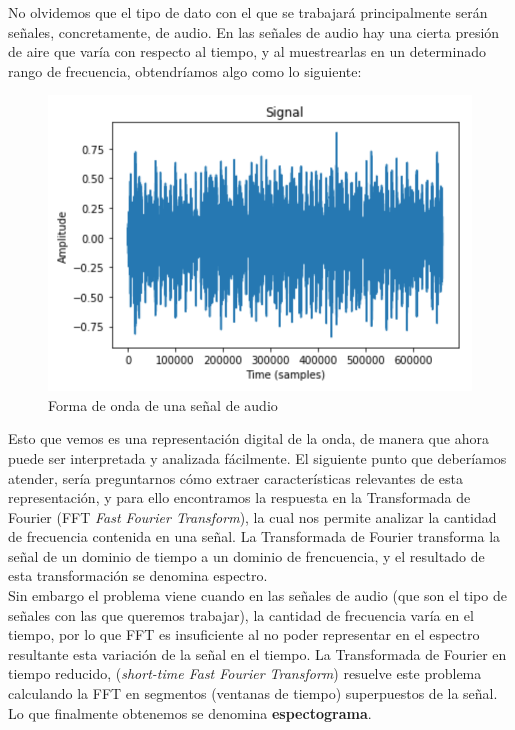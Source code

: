 \documentclass[11pt,a4paper,spanish]{book}
\begin{document}
	No olvidemos que el tipo de dato con el que se trabajará principalmente serán señales, concretamente, de audio. En las señales de audio hay una cierta presión de aire que varía con respecto al tiempo, y al muestrearlas en un determinado rango de frecuencia, obtendríamos algo como lo siguiente:
	
	\begin{figure}[H]
		\centering
		\includegraphics[scale=0.3]{waveform.png}
		\caption{Forma de onda de una señal de audio}
	\end{figure}
	
	Esto que vemos es una representación digital de la onda, de manera que ahora puede ser interpretada y analizada fácilmente.\hfill \break
	El siguiente punto que deberíamos atender, sería preguntarnos cómo extraer características relevantes de esta representación, y para ello encontramos la respuesta en la Transformada de Fourier (FFT \emph{Fast Fourier Transform}), la cual nos permite analizar la cantidad de frecuencia contenida en una señal. La Transformada de Fourier transforma la señal de un dominio de tiempo a un dominio de frencuencia, y el resultado de esta transformación se denomina espectro. \\
	Sin embargo el problema viene cuando en las señales de audio (que son el tipo de señales con las que queremos trabajar), la cantidad de frecuencia varía en el tiempo, por lo que FFT es insuficiente al no poder representar en el espectro resultante esta variación de la señal en el tiempo. La Transformada de Fourier en tiempo reducido, (\emph{short-time Fast Fourier Transform}) resuelve este problema calculando la FFT en segmentos (ventanas de tiempo) superpuestos de la señal. Lo que finalmente obtenemos se denomina \textbf{espectograma}.
	
\end{document}

